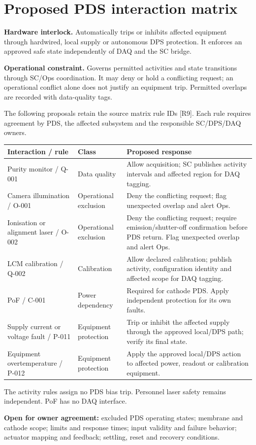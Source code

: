 \section{Proposed PDS interaction matrix}
\label{sec:proposed-matrix}

\textbf{Hardware interlock.} Automatically trips or inhibits affected equipment
through hardwired, local supply or autonomous DPS protection. It enforces an
approved safe state independently of DAQ and the SC bridge.

\textbf{Operational constraint.} Governs permitted activities and state
transitions through SC/Ops coordination. It may deny or hold a conflicting
request; an operational conflict alone does not justify an equipment trip.
Permitted overlaps are recorded with data-quality tags.

The following proposals retain the source matrix rule IDs [R9]. Each rule
requires agreement by PDS, the affected subsystem and the responsible
SC/DPS/DAQ owners.

\begin{center}\small
\begin{tabular}{L{0.27\textwidth}L{0.20\textwidth}L{0.46\textwidth}}
\toprule
\textbf{Interaction / rule} & \textbf{Class} & \textbf{Proposed response} \\
\midrule
Purity monitor / Q-001 & Data quality & Allow acquisition; SC publishes activity intervals and affected region for DAQ tagging. \\
Camera illumination / O-001 & Operational exclusion & Deny the conflicting request; flag unexpected overlap and alert Ops. \\
Ionisation or alignment laser / O-002 & Operational exclusion & Deny the conflicting request; require emission/shutter-off confirmation before PDS return. Flag unexpected overlap and alert Ops. \\
LCM calibration / Q-002 & Calibration & Allow declared calibration; publish activity, configuration identity and affected scope for DAQ tagging. \\
PoF / C-001 & Power dependency & Required for cathode PDS. Apply independent protection for its own faults. \\
Supply current or voltage fault / P-011 & Equipment protection & Trip or inhibit the affected supply through the approved local/DPS path; verify its final state. \\
Equipment overtemperature / P-012 & Equipment protection & Apply the approved local/DPS action to affected power, readout or calibration equipment. \\
\bottomrule
\end{tabular}
\end{center}

The activity rules assign no PDS bias trip. Personnel laser safety remains
independent. PoF has no DAQ interface.

\textbf{Open for owner agreement:} excluded PDS operating states; membrane and
cathode scope; limits and response times; input validity and failure behavior;
actuator mapping and feedback; settling, reset and recovery conditions.
